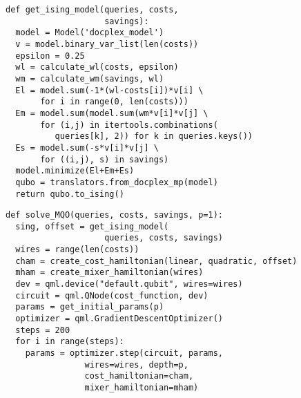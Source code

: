 \newsavebox\pennyra\newsavebox\pennyrb
\begin{lrbox}{\pennyra}
\begin{minipage}{(\boxwidth-\hsep)/2}\lsttopcorr
\begin{lstlisting}
def get_ising_model(queries, costs,
                    savings):
  model = Model('docplex_model')
  v = model.binary_var_list(len(costs))
  epsilon = 0.25
  wl = calculate_wl(costs, epsilon)
  wm = calculate_wm(savings, wl)
  El = model.sum(-1*(wl-costs[i])*v[i] \
       for i in range(0, len(costs)))
  Em = model.sum(model.sum(wm*v[i]*v[j] \
       for (i,j) in itertools.combinations(
          queries[k], 2)) for k in queries.keys())
  Es = model.sum(-s*v[i]*v[j] \
       for ((i,j), s) in savings)
  model.minimize(El+Em+Es)  
  qubo = translators.from_docplex_mp(model)
  return qubo.to_ising()	
\end{lstlisting}\vspace*{-1em}\end{minipage}
\end{lrbox}
\begin{lrbox}{\pennyrb}
\begin{minipage}{(\boxwidth-\hsep)/2}\lsttopcorr
\begin{lstlisting}
def solve_MQO(queries, costs, savings, p=1):   
  sing, offset = get_ising_model(
                    queries, costs, savings)
  wires = range(len(costs))
  cham = create_cost_hamiltonian(linear, quadratic, offset)
  mham = create_mixer_hamiltonian(wires)
  dev = qml.device("default.qubit", wires=wires)
  circuit = qml.QNode(cost_function, dev)   
  params = get_initial_params(p)  
  optimizer = qml.GradientDescentOptimizer()
  steps = 200  
  for i in range(steps):
    params = optimizer.step(circuit, params,
                wires=wires, depth=p,
                cost_hamiltonian=cham,
                mixer_hamiltonian=mham)
\end{lstlisting}\vspace*{-1em}\end{minipage}
\end{lrbox}


